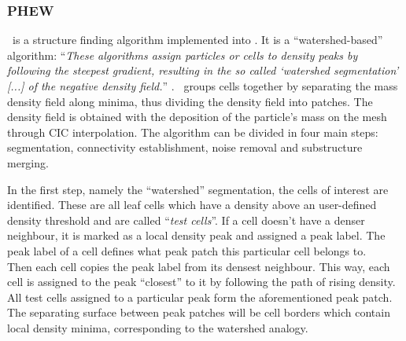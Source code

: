 




















\subsubsection{{\normalfont \scshape PHEW}} \label{chap:phew}

\phew\ is a structure finding algorithm implemented into \ramses. 
It is a ``watershed-based'' algorithm: ``\textit{These algorithms assign particles or cells to density peaks by following the steepest gradient, resulting in the so called `watershed segmentation' [...] of the negative density field.}'' \parencite{PHEW}.
\phew\ groups cells together by separating the mass density field along minima, thus dividing the density field into patches.
The density field is obtained with the deposition of the particle's mass on the mesh through CIC interpolation.
The algorithm can be divided in four main steps: segmentation, connectivity establishment, noise removal and substructure merging. 

In the first step, namely the ``watershed'' segmentation, the cells of interest are identified. %
These are all leaf cells which have a density above an user-defined density threshold and are called ``\emph{test cells}''.
If a cell doesn't have a denser neighbour, it is marked as a local density peak and assigned a peak label.
The peak label of a cell defines what peak patch this particular cell belongs to.\\
Then each cell copies the peak label from its densest neighbour.
This way, each cell is assigned to the peak ``closest'' to it by following the path of rising density. 
All test cells assigned to a particular peak form the aforementioned peak patch.
The separating surface between peak patches will be cell borders which contain local density minima, corresponding to the watershed analogy.

